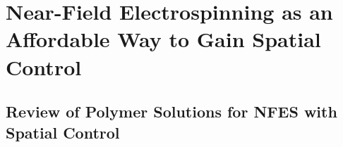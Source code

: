 
\chapter{Near-Field Electrospinning as an Affordable Way to Gain Spatial Control} %

\label{Chapter:3}

\section{Review of Polymer Solutions for NFES with Spatial Control}


